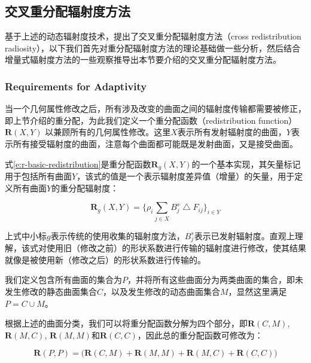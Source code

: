 \subsection{交叉重分配辐射度方法}\label{sec:r-cross-edistribution-adiosity}
基于上述的动态辐射度技术，\cite{a:Real-TimeDynamicRadiosityforHighQualityGlobalIllumination}提出了交叉重分配辐射度方法（cross redistribution radiosity），以下我们首先对重分配辐射度方法的理论基础做一些分析，然后结合增量式辐射度方法的一些观察推导出本节要介绍的交叉重分配辐射度方法。



\subsubsection{Requirements for Adaptivity}
当一个几何属性修改之后，所有涉及改变的曲面之间的辐射度传输都需要被修正，即上节介绍的重分配，为此我们定义一个重分配函数（redistribution function） $\mathbf{R}(X,Y)$ 以兼顾所有的几何属性修改。这里$X$表示所有发射辐射度的曲面，$Y$表示所有接受辐射度的曲面，注意每个曲面都可能既是发射曲面，又是接受曲面。

式\ref{e:r-basic-redistribution}是重分配函数$\mathbf{R}_g(X,Y)$的一个基本实现，其矢量标记用于包括所有曲面$Y$，该式的值是一个表示辐射度差异值（增量）的矢量，用于定义所有曲面$Y$的重分配辐射度：

\begin{equation}\label{e:r-basic-redistribution}
	\mathbf{R}_g(X,Y)=\Biggr\{ \rho_i\sum_{j\in X}B^{s}_j \bigtriangleup F_{ij} \Biggr\}_{i\in Y}
\end{equation}

\noindent 上式中小标$g$表示传统的使用收集的辐射度方法，$B^{s}_j$表示已发射辐射度。直观上理解，该式对使用旧（修改之前）的形状系数进行传输的辐射度进行修改，使其结果就像是被使用新（修改之后）的形状系数进行传输的。

我们定义包含所有曲面的集合为$P$，并将所有这些曲面分为两类曲面的集合，即未发生修改的静态曲面集合$C$，以及发生修改的动态曲面集合$M$，显然这里满足$P=C\cup M$。

根据上述的曲面分类，我们可以将重分配函数分解为四个部分，即$\mathbf{R}(C,M)$, $\mathbf{R}(M, C)$, $\mathbf{R}(M, M)$和$\mathbf{R}(C, C)$，因此总的重分配函数可修改为：

\begin{equation}
	\mathbf{R}(P, P)=\bigg( \mathbf{R}(C,M)+\mathbf{R}(M,M)+\mathbf{R}(M,C)+\mathbf{R}(C,C) \bigg)
\end{equation}

